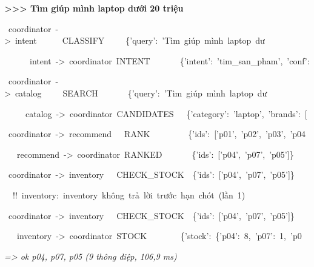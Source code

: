 \textbf{>>> Tìm giúp mình laptop dưới 20 triệu}\par
[~~~2.5~ms]~coordinator~->~intent~~~~~~CLASSIFY~~~~~\{'query':~'Tìm~giúp~mình~laptop~dư\par
[~~11.1~ms]~~~~~~intent~->~coordinator~INTENT~~~~~~~\{'intent':~'tim\_san\_pham',~'conf':\par
[~~14.2~ms]~coordinator~->~catalog~~~~~SEARCH~~~~~~~\{'query':~'Tìm~giúp~mình~laptop~dư\par
[~~17.1~ms]~~~~~catalog~->~coordinator~CANDIDATES~~~\{'category':~'laptop',~'brands':~[\par
[~~18.9~ms]~coordinator~->~recommend~~~RANK~~~~~~~~~\{'ids':~['p01',~'p02',~'p03',~'p04\par
[~~22.0~ms]~~~recommend~->~coordinator~RANKED~~~~~~~\{'ids':~['p04',~'p07',~'p05']\}\par
[~~23.5~ms]~coordinator~->~inventory~~~CHECK\_STOCK~~\{'ids':~['p04',~'p07',~'p05']\}\par
[~103.5~ms]~~!!~inventory:~inventory~không~trả~lời~trước~hạn~chót~(lần~1)\par
[~105.3~ms]~coordinator~->~inventory~~~CHECK\_STOCK~~\{'ids':~['p04',~'p07',~'p05']\}\par
[~106.9~ms]~~~inventory~->~coordinator~STOCK~~~~~~~~\{'stock':~\{'p04':~8,~'p07':~1,~'p0\par
\textit{=> ok p04, p07, p05 (9 thông điệp, 106{,}9 ms)}
